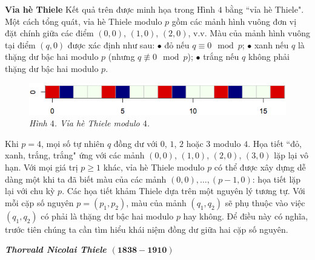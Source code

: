 \begin{multicols}{2}
	\vskip 0.2cm
	\textbf{\color{toanhocdoisong}Vỉa hè Thiele}
	\vskip 0.2cm
	Kết quả trên được minh họa trong Hình $4$ bằng ``vỉa hè Thiele". Một cách tổng quát, vỉa hè Thiele modulo $p$ gồm các mảnh hình vuông đơn vị đặt chính giữa các điểm $(0, 0)$, $(1, 0)$, $(2, 0)$, v.v. Màu của mảnh hình vuông tại điểm $(q, 0)$ được xác định như sau:
	\vskip 0.1cm
	$\bullet$	đỏ nếu $q \equiv 0 \mod{p}$;
	\vskip 0.1cm
	$\bullet$	xanh nếu $q$ là thặng dư bậc hai modulo $p$ (nhưng $q \not\equiv 0 \mod{p}$);
	\vskip 0.1cm
	$\bullet$	trắng nếu $q$ không phải thặng dư bậc hai modulo $p$.
	\begin{figure}[H]
		\vspace*{-5pt}
		\centering
		\captionsetup{labelformat= empty, justification=centering}
		\includegraphics[width= 1\linewidth]{mosaique-4.png}
		\caption{\small\textit{\color{toanhocdoisong}Hình $4$. Vỉa hè Thiele modulo $4$.}}
		\vspace*{-10pt}
	\end{figure}
	Khi $p = 4$, mọi số tự nhiên $q$ đồng dư với $0$, $1$, $2$ hoặc $3$ modulo $4$. Họa tiết ``đỏ, xanh, trắng, trắng" ứng với các mảnh $(0, 0)$, $(1, 0)$, $(2, 0)$, $(3, 0)$ lặp lại vô hạn. Với mọi giá trị $p \ge 1$ khác, vỉa hè Thiele modulo $p$ có thể được xây dựng dễ dàng một khi ta đã biết màu của các mảnh $(0, 0), \dots, (p - 1, 0)$: họa tiết lặp lại với chu kỳ $p$.
	\vskip 0.2cm
	Các họa tiết khảm Thiele dựa trên một nguyên lý tương tự. Với mỗi cặp số nguyên $p = (p_1, p_2)$, màu của mảnh $(q_1, q_2)$ sẽ phụ thuộc vào việc $(q_1, q_2)$ có phải là thặng dư bậc hai modulo $p$ hay không. Để điều này có nghĩa, trước tiên chúng ta cần tìm hiểu khái niệm đồng dư giữa hai cặp số nguyên.
	\begin{tBox}
		\textbf{\textit{\color{toanhocdoisong}Thorvald Nicolai Thiele $\pmb{(1838 \!-\! 1910)}$}}
		\vskip 0.2cm
		\begin{figure}
			\vspace*{-14pt}
			\centering
			\captionsetup{labelformat= empty, justification=centering}

\end{figure}
\end{tBox}
\end{multicols}
